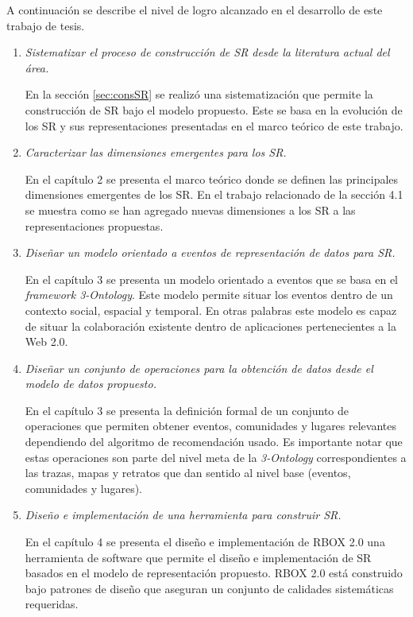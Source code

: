 A continuación se describe el nivel de logro alcanzado en el desarrollo de este trabajo de tesis.
\begin{enumerate}
	\item \textit{Sistematizar el proceso de construcción de SR desde la literatura actual del área.}
	
	En la sección \ref{sec:consSR} se realizó una sistematización que permite la construcción de SR bajo el modelo propuesto. Este se basa en la evolución de los SR y sus representaciones presentadas en el marco teórico de este trabajo.
	
	\item \textit{Caracterizar las dimensiones emergentes para los SR.}
	
	En el capítulo 2 se presenta el marco teórico donde se definen las principales dimensiones emergentes de los SR. En el trabajo relacionado de la sección 4.1 se muestra como se han agregado nuevas dimensiones a los SR a las representaciones propuestas. 
	
	\item \textit{Diseñar un modelo orientado a eventos de representación de datos para SR.}
	
	En el capítulo 3 se presenta un modelo orientado a eventos que se basa en el \textit{framework 3-Ontology}. Este modelo permite situar los eventos dentro de un contexto social, espacial y temporal. En otras palabras este modelo es capaz de situar la colaboración existente dentro de aplicaciones pertenecientes a la Web 2.0.
	
	\item \textit{Diseñar un conjunto de operaciones para la obtención de datos desde el modelo de datos propuesto.}
	
	En el capítulo 3 se presenta la definición formal de un conjunto de operaciones que permiten obtener eventos, comunidades y lugares relevantes dependiendo del algoritmo de recomendación usado. Es importante notar que estas operaciones son parte del nivel meta de la \textit{3-Ontology} correspondientes a las trazas, mapas y retratos que dan sentido al nivel base (eventos, comunidades y lugares).
	
	\item \textit{Diseño e implementación de una herramienta para construir SR.}
	
	En el capítulo 4 se presenta el diseño e implementación de RBOX 2.0 una herramienta de software que permite el diseño e implementación de SR basados en el modelo de representación propuesto. RBOX 2.0 está construido bajo patrones de diseño que aseguran un conjunto de calidades sistemáticas requeridas. 
	

\end{enumerate}
